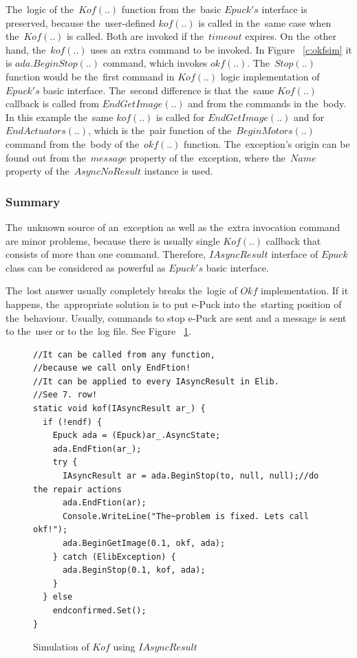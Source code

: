   The~logic of the~$Kof(..)$ function from the~basic $Epuck's$ interface is preserved, because the~user-defined
  $kof(..)$ is called in the~same case when the~$Kof(..)$ is called. Both are invoked if the~$timeout$ expires.
  On the~other hand, the~$kof(..)$ uses an extra command to be invoked. In Figure ~\ref{c:okfsim} it
  is $ada.BeginStop(..)$ command, which invokes $okf(..)$. The~$Stop(..)$ function would be the~first command
  in $Kof(..)$ logic implementation of $Epuck's$ basic interface.
  The~second difference is that the~same $Kof(..)$ callback is called from $EndGetImage(..)$ and from the
  commands in the~body. In this example the~same $kof(..)$ is called for $EndGetImage(..)$ and 
  for $EndActuators(..)$, which is the~pair function of the~$BeginMotors(..)$ 
  command from the~body of the~$okf(..)$ function.
  The~exception's origin can be found out from the~$message$ property of the~exception, 
  where the~$Name$ property of the~$AsyncNoResult$ instance is used.

  \subsubsection*{Summary} %
  The~unknown source of an~exception as well as the~extra invocation command are minor problems, because
  there is usually single $Kof(..)$ callback that consists of more than one command. 
  Therefore, $IAsyncResult$ interface of $Epuck$ class can be considered as powerful as $Epuck's$ basic interface.

  \begin{remark} The~lost answer usually completely breaks the~logic of $Okf$
  implementation. If it happens, the~appropriate solution is to put e-Puck into
  the~starting position of the~behaviour. Usually, commands to stop e-Puck are
  sent and a message is sent to the~user or to the~log file. See Figure
  ~\ref{iasynckof}. \end{remark}

\begin{figure}[!hbp]
\begin{lstlisting}
//It can be called from any function,
//because we call only EndFtion!
//It can be applied to every IAsyncResult in Elib.
//See 7. row!
static void kof(IAsyncResult ar_) {
  if (!endf) {
    Epuck ada = (Epuck)ar_.AsyncState;
    ada.EndFtion(ar_);
    try {
      IAsyncResult ar = ada.BeginStop(to, null, null);//do the repair actions
      ada.EndFtion(ar);
      Console.WriteLine("The~problem is fixed. Lets call okf!");
      ada.BeginGetImage(0.1, okf, ada);
    } catch (ElibException) {
      ada.BeginStop(0.1, kof, ada);
    }
  } else
    endconfirmed.Set();
}
\end{lstlisting}
\caption{Simulation of $Kof$ using $IAsyncResult$}
\label{iasynckof}
\end{figure}

